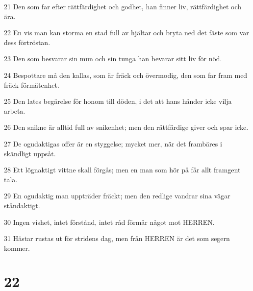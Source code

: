 \par 21 Den som far efter rättfärdighet och godhet, han finner liv, rättfärdighet och ära.
\par 22 En vis man kan storma en stad full av hjältar och bryta ned det fäste som var dess förtröstan.
\par 23 Den som besvarar sin mun och sin tunga han bevarar sitt liv för nöd.
\par 24 Bespottare må den kallas, som är fräck och övermodig, den som far fram med fräck förmätenhet.
\par 25 Den lates begärelse för honom till döden, i det att hans händer icke vilja arbeta.
\par 26 Den snikne är alltid full av snikenhet; men den rättfärdige giver och spar icke.
\par 27 De ogudaktigas offer är en styggelse; mycket mer, när det frambäres i skändligt uppsåt.
\par 28 Ett lögnaktigt vittne skall förgås; men en man som hör på får allt framgent tala.
\par 29 En ogudaktig man uppträder fräckt; men den redlige vandrar sina vägar ståndaktigt.
\par 30 Ingen vishet, intet förstånd, intet råd förmår något mot HERREN.
\par 31 Hästar rustas ut för stridens dag, men från HERREN är det som segern kommer.

\chapter{22}

